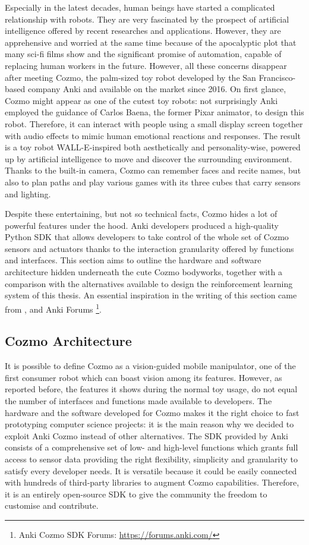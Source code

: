 Especially in the latest decades, human beings have started a complicated relationship with robots.
They are very fascinated by the prospect of artificial intelligence offered by recent researches and applications.
However, they are apprehensive and worried at the same time because of the apocalyptic plot that many sci-fi films show and the significant promise of automation, capable of replacing human workers in the future.
However, all these concerns disappear after meeting Cozmo, the palm-sized toy robot developed by the San Francisco-based company Anki and available on the market since 2016.
On first glance, Cozmo might appear as one of the cutest toy robots: not surprisingly Anki employed the guidance of Carlos Baena, the former Pixar animator, to design this robot.
Therefore, it can interact with people using a small display screen together with audio effects to mimic human emotional reactions and responses.
The result is a toy robot WALL-E-inspired both aesthetically and personality-wise, powered up by artificial intelligence to move and discover the surrounding environment.
Thanks to the built-in camera, Cozmo can remember faces and recite names, but also to plan paths and play various games with its three cubes that carry sensors and lighting.

Despite these entertaining, but not so technical facts, Cozmo hides a lot of powerful features under the hood.
Anki developers produced a high-quality Python SDK that allows developers to take control of the whole set of Cozmo sensors and actuators thanks to the interaction granularity offered by functions and interfaces.
This section aims to outline the hardware and software architecture hidden underneath the cute Cozmo bodyworks, together with a comparison with the alternatives available to design the reinforcement learning system of this thesis.
An essential inspiration in the writing of this section came from \cite{mellon2017cognitive}, \cite{touretzky2018cozmopedia} and Anki Forums \footnote{Anki Cozmo SDK Forums: \href{https://forums.anki.com/}{https://forums.anki.com/}}.

\subsection{Cozmo Architecture}

It is possible to define Cozmo as a vision-guided mobile manipulator, one of the first consumer robot which can boast vision among its features.
However, as reported before, the features it shows during the normal toy usage, do not equal the number of interfaces and functions made available to developers.
The hardware and the software developed for Cozmo makes it the right choice to fast prototyping computer science projects: it is the main reason why we decided to exploit Anki Cozmo instead of other alternatives.
The SDK provided by Anki consists of a comprehensive set of low- and high-level functions which grants full access to sensor data providing the right flexibility, simplicity and granularity to satisfy every developer needs.
It is versatile because it could be easily connected with hundreds of third-party libraries to augment Cozmo capabilities.
Therefore, it is an entirely open-source SDK to give the community the freedom to customise and contribute.

